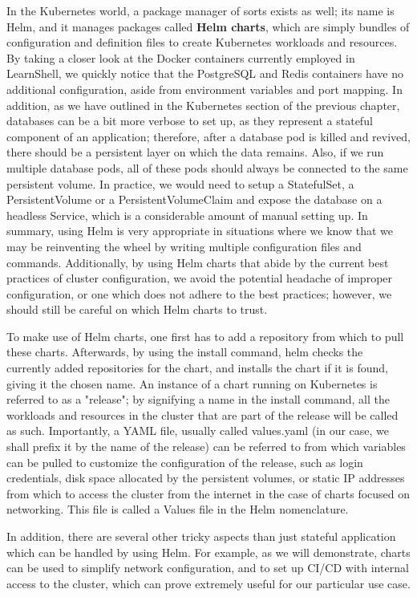 \documentclass[thesis=B,english]{FITthesis}[2019/12/23]
\begin{document}
In the Kubernetes world, a package manager of sorts exists as well; its name is Helm, and it manages packages called \textbf{Helm charts}, which are simply bundles of configuration and definition files to create Kubernetes workloads and resources. By taking a closer look at the Docker containers currently employed in LearnShell, we quickly notice that the PostgreSQL and Redis containers have no additional configuration, aside from environment variables and port mapping. In addition, as we have outlined in the Kubernetes section of the previous chapter, databases can be a bit more verbose to set up, as they represent a stateful component of an application; therefore, after a database pod is killed and revived, there should be a persistent layer on which the data remains. Also, if we run multiple database pods, all of these pods should always be connected to the same persistent volume. In practice, we would need to setup a StatefulSet, a PersistentVolume or a PersistentVolumeClaim and expose the database on a headless Service, which is a considerable amount of manual setting up.
In summary, using Helm is very appropriate in situations where we know that we may be reinventing the wheel by writing multiple configuration files and commands. Additionally, by using Helm charts that abide by the current best practices of cluster configuration, we avoid the potential headache of improper configuration, or one which does not adhere to the best practices; however, we should still be careful on which Helm charts to trust.

To make use of Helm charts, one first has to add a repository from which to pull these charts. Afterwards, by using the install command, helm checks the currently added repositories for the chart, and installs the chart if it is found, giving it the chosen name. An instance of a chart running on Kubernetes is referred to as a "release"; by signifying a name in the install command, all the workloads and resources in the cluster that are part of the release will be called as such. Importantly, a YAML file, usually called values.yaml (in our case, we shall prefix it by the name of the release) can be referred to from which variables can be pulled to customize the configuration of the release, such as login credentials, disk space allocated by the persistent volumes, or static IP addresses from which to access the cluster from the internet in the case of charts focused on networking. This file is called a Values file in the Helm nomenclature. \cite{using-helm}

In addition, there are several other tricky aspects than just stateful application which can be handled by using Helm. For example, as we will demonstrate, charts can be used to simplify network configuration, and to set up CI/CD with internal access to the cluster, which can prove extremely useful for our particular use case.
\end{document}
